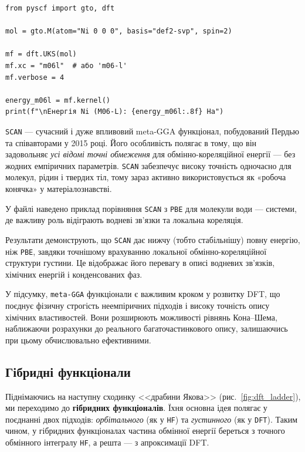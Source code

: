 \begin{verbatim}
from pyscf import gto, dft

mol = gto.M(atom="Ni 0 0 0", basis="def2-svp", spin=2)

mf = dft.UKS(mol)
mf.xc = "m06l"  # або 'm06-l'
mf.verbose = 4

energy_m06l = mf.kernel()
print(f"\nЕнергія Ni (M06-L): {energy_m06l:.8f} Ha")
\end{verbatim}

\texttt{SCAN} --- сучасний і дуже впливовий meta-GGA функціонал, побудований Пердью та співавторами у 2015 році.
Його особливість полягає в тому, що він задовольняє \emph{усі відомі точні обмеження} для обмінно-кореляційної енергії --- без жодних емпіричних параметрів.
\texttt{SCAN} забезпечує високу точність одночасно для молекул, рідин і твердих тіл, тому зараз активно використовується як «робоча конячка» у матеріалознавстві.

У файлі  наведено приклад порівняння \texttt{SCAN} з \texttt{PBE} для молекули води --- системи, де важливу роль відіграють водневі зв’язки та локальна кореляція.

Результати демонструють, що \texttt{SCAN} дає нижчу (тобто стабільнішу) повну енергію, ніж \texttt{PBE}, завдяки точнішому врахуванню локальної обмінно-кореляційної структури густини.
Це відображає його перевагу в описі водневих зв’язків, хімічних енергій і конденсованих фаз.


У підсумку, \texttt{meta-GGA} функціонали є важливим кроком у розвитку DFT, що поєднує фізичну строгість неемпіричних підходів і високу точність опису хімічних властивостей.
Вони розширюють можливості рівнянь Кона–Шема, наближаючи розрахунки до реального багаточастинкового опису, залишаючись при цьому обчислювально ефективними.


\subsection{Гібридні функціонали}

Піднімаючись на наступну сходинку <<драбини Якова>> (рис.~\ref{fig:dft_ladder}), ми переходимо до \textbf{гібридних функціоналів}.
Їхня основна ідея полягає у поєднанні двох підходів: \emph{орбітального} (як у \texttt{HF}) та \emph{густинного} (як у \texttt{DFT}).
Таким чином, у гібридних функціоналах частина обмінної енергії береться з точного обмінного інтегралу \texttt{HF}, а решта --- з апроксимації DFT.

